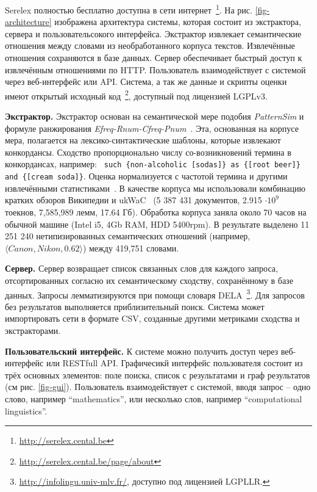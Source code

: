 \documentclass[a4paper,10pt,twoside]{article}
\begin{document}
Serelex полностью бесплатно доступна в сети интернет~\footnote{ \url{http://serelex.cental.be}}.
На рис. \ref{fig-architecture} изображена архитектура системы, которая состоит из экстрактора, сервера и пользовательсокого интерфейса. Экстрактор извлекает семантические отношения между словами из необработанного корпуса текстов. Извлечённые отношения сохраняются в базе данных. Сервер обеспечивает быстрый доступ к извлечённым отношениями по HTTP. Пользователь взаимодействует с системой через веб-интерфейс или API. Система, а так же данные и скрипты оценки имеют открытый исходный код~\footnote{ \url{http://serelex.cental.be/page/about}}, доступный под лицензией LGPLv3.


\textbf{Экстрактор.} Экстрактор основан на семантической мере подобия \textit{PatternSim} и  формуле ранжирования \textit{Efreq-Rnum-Cfreq-Pnum}~\cite{panchenko2012konvens}. Эта, основанная на корпусе мера, полагается на лексико-синтактические шаблоны, которые извлекают конкордансы. Сходство пропорционально числу со-возникновений термина в конкордансах, например: \texttt{ \footnotesize such \{non-alcoholic [sodas]\} as \{[root beer]\} and \{[cream soda]\}}. Оценка нормализуется с частотой термина и другими извлечёнными статистиками~\cite{panchenko2012konvens}. В качестве корпуса мы использовали комбинацию кратких обзоров Википедии и ukWaC~\cite{baroni2009wacky} (5 387 431 документов, 2.915 $\cdot 10^9$ тоекнов, 7,585,989 лемм, 17.64 Гб). Обработка корпуса заняла около 70 часов на обычной машине (Intel i5, 4Gb RAM, HDD 5400rpm). В результате выделено  11 251 240 нетипизированных семантических отношений (например, $\langle Canon, Nikon, 0.62 \rangle$) между 419,751 словами. 

\textbf{Сервер.} Сервер возвращает список связанных слов для каждого запроса, отсортированных согласно их семантическому сходству, сохранённому в базе данных. Запросы лемматизируются при помощи словаря DELA~\footnote{\url{http://infolingu.univ-mlv.fr/}, доступно под лицензией LGPLLR.}. Для запросов без результатов выполняется приблизительный поиск. Система может импортировать сети в формате CSV, созданные другими метриками сходства и экстракторами.

\textbf{Пользовательский интерфейс.} К системе можно получить доступ через веб-интерфейс или RESTfull API. Графичесикй интерфейс пользователя состоит из трёх основных элементов: поле поиска, список с результатами и граф результатов (см рис. \ref{fig-gui}). Пользователь взаимодействует с системой, вводя запрос -- одно слово, например ``mathematics'', или несколько слов, например ``computational linguistics''. 
\end{document}
